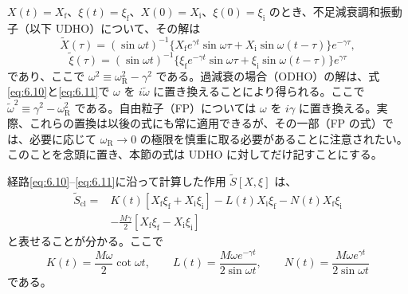 $X(t)=X_{\mathrm f}$、$\xi(t)=\xi_{\mathrm f}$、$X(0)=X_{\mathrm i}$、$\xi(0)=\xi_{\mathrm i}$ のとき、不足減衰調和振動子（以下 UDHO）について、その解は
\begin{equation}
\tilde X(\tau)=(\sin\omega t)^{-1}
\bigl\{X_{\mathrm f}e^{\gamma t}\sin\omega\tau
+X_{\mathrm i}\sin\omega(t-\tau)\bigr\}e^{-\gamma\tau},
\tag{6.10}\label{eq:6.10}
\end{equation}
\begin{equation}
\tilde\xi(\tau)=(\sin\omega t)^{-1}
\bigl\{\xi_{\mathrm f}e^{-\gamma t}\sin\omega\tau
+\xi_{\mathrm i}\sin\omega(t-\tau)\bigr\}e^{\gamma\tau}
\tag{6.11}\label{eq:6.11}
\end{equation}
であり、ここで $\omega^2\equiv\omega_{\mathrm R}^2-\gamma^2$ である。過減衰の場合（ODHO）の解は、式\eqref{eq:6.10}と\eqref{eq:6.11}で $\omega$ を $i\tilde\omega$ に置き換えることにより得られる。ここで $\tilde\omega^2\equiv\gamma^2-\omega_{\mathrm R}^2$ である。自由粒子（FP）については $\omega$ を $i\gamma$ に置き換える。実際、これらの置換は以後の式にも常に適用できるが、その一部（FP の式）では、必要に応じて $\omega_{\mathrm R}\to0$ の極限を慎重に取る必要があることに注意されたい。このことを念頭に置き、本節の式は UDHO に対してだけ記すことにする。

経路\eqref{eq:6.10}--\eqref{eq:6.11}に沿って計算した作用 $\tilde S[X,\xi]$ は、
\begin{equation}
\begin{aligned}
\tilde S_{\mathrm{cl}}={}&K(t)[X_{\mathrm f}\xi_{\mathrm f}+X_{\mathrm i}\xi_{\mathrm i}]
-L(t)X_{\mathrm i}\xi_{\mathrm f}-N(t)X_{\mathrm f}\xi_{\mathrm i}\\
&-\frac{M\gamma}{2}[X_{\mathrm f}\xi_{\mathrm f}-X_{\mathrm i}\xi_{\mathrm i}]
\end{aligned}
\tag{6.12}\label{eq:6.12}
\end{equation}
と表せることが分かる。ここで
\begin{equation}
K(t)=\frac{M\omega}{2}\cot\omega t,\qquad
L(t)=\frac{M\omega e^{-\gamma t}}{2\sin\omega t},\qquad
N(t)=\frac{M\omega e^{\gamma t}}{2\sin\omega t}
\tag{6.13}\label{eq:6.13}
\end{equation}
である。


